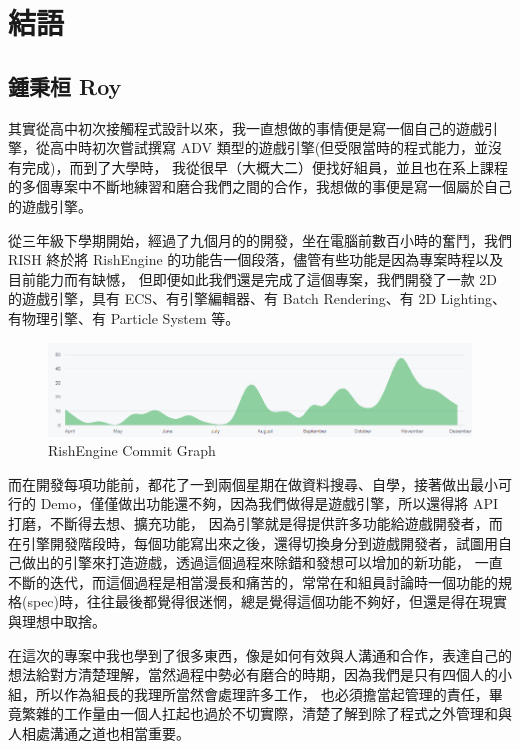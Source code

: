\chapter{結語}

\section{鍾秉桓 Roy}
\label{sec:Roy}

其實從高中初次接觸程式設計以來，我一直想做的事情便是寫一個自己的遊戲引擎，從高中時初次嘗試撰寫 ADV 類型的遊戲引擎(但受限當時的程式能力，並沒有完成)，而到了大學時，
我從很早（大概大二）便找好組員，並且也在系上課程的多個專案中不斷地練習和磨合我們之間的合作，我想做的事便是寫一個屬於自己的遊戲引擎。

從三年級下學期開始，經過了九個月的的開發，坐在電腦前數百小時的奮鬥，我們 RISH 終於將 RishEngine 的功能告一個段落，儘管有些功能是因為專案時程以及目前能力而有缺憾，
但即便如此我們還是完成了這個專案，我們開發了一款 2D 的遊戲引擎，具有 ECS、有引擎編輯器、有 Batch Rendering、有 2D Lighting、有物理引擎、有 Particle System 等。

\begin{figure}[h]
    \begin{center}
    \includegraphics[width=\textwidth]{./resources/ch6/commit.png}
    \end{center}
\caption{RishEngine Commit Graph}
\label{fig:RishEngineCommits}
\end{figure}

而在開發每項功能前，都花了一到兩個星期在做資料搜尋、自學，接著做出最小可行的 Demo，僅僅做出功能還不夠，因為我們做得是遊戲引擎，所以還得將 API 打磨，不斷得去想、擴充功能，
因為引擎就是得提供許多功能給遊戲開發者，而在引擎開發階段時，每個功能寫出來之後，還得切換身分到遊戲開發者，試圖用自己做出的引擎來打造遊戲，透過這個過程來除錯和發想可以增加的新功能，
一直不斷的迭代，而這個過程是相當漫長和痛苦的，常常在和組員討論時一個功能的規格(spec)時，往往最後都覺得很迷惘，總是覺得這個功能不夠好，但還是得在現實與理想中取捨。

在這次的專案中我也學到了很多東西，像是如何有效與人溝通和合作，表達自己的想法給對方清楚理解，當然過程中勢必有磨合的時期，因為我們是只有四個人的小組，所以作為組長的我理所當然會處理許多工作，
也必須擔當起管理的責任，畢竟繁雜的工作量由一個人扛起也過於不切實際，清楚了解到除了程式之外管理和與人相處溝通之道也相當重要。

